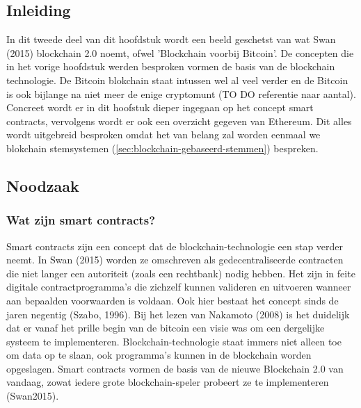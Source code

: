 	\subsection*{Inleiding}
		In dit tweede deel van dit hoofdstuk wordt een beeld geschetst van wat Swan (2015) blockchain 2.0 noemt, ofwel 'Blockchain voorbij Bitcoin'. De concepten die in het vorige hoofdstuk werden besproken vormen de basis van de blockchain technologie. De Bitcoin blokchain staat intussen wel al veel verder en de Bitcoin is ook bijlange na niet meer de enige cryptomunt (TO DO referentie naar aantal).  Concreet wordt er in dit hoofstuk dieper ingegaan op het concept  smart contracts, vervolgens wordt er ook een overzicht gegeven van Ethereum. Dit alles wordt uitgebreid besproken omdat het van belang zal worden eenmaal we blokchain stemsystemen (\ref{sec:blockchain-gebaseerd-stemmen}) bespreken.
	\subsection{Noodzaak}
		\subsubsection{Wat  zijn smart contracts?}
			Smart contracts zijn een concept dat de blockchain-technologie een stap verder neemt. In Swan (2015) worden ze omschreven als gedecentraliseerde contracten die niet langer een autoriteit (zoals een rechtbank) nodig hebben. Het zijn in feite digitale contractprogramma’s die zichzelf kunnen valideren en uitvoeren wanneer aan bepaalden voorwaarden is voldaan. Ook hier bestaat het concept sinds de jaren negentig (Szabo, 1996). Bij het lezen van Nakamoto (2008) is het duidelijk dat er vanaf het prille begin van de bitcoin een visie was om een dergelijke systeem te implementeren. Blockchain-technologie staat immers niet alleen toe om data op te slaan, ook programma’s kunnen in de blockchain worden opgeslagen. Smart contracts vormen de basis van de nieuwe Blockchain 2.0 van vandaag, zowat iedere grote blockchain-speler probeert ze te implementeren (Swan2015).
